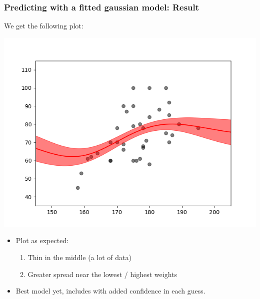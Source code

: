\documentclass[10pt,aspectratio=169,handout]{beamer}
\begin{document}
\begin{frame}
    \frametitle{Predicting with a fitted gaussian model: Result}

    We get the following plot:

    \begin{minipage}{0.45\textwidth}
        \includegraphics[width=\textwidth]{images/task-3-6.png}
    \end{minipage}
    \begin{minipage}{0.45\textwidth}
        \begin{itemize}
            \item Plot as expected:
            \begin{enumerate}
                \item Thin in the middle (a lot of data)
                \item Greater spread near the lowest / highest weights
            \end{enumerate}
            \item Best model yet, includes with added confidence in each guess.
        \end{itemize}
    \end{minipage}

\end{frame}
\end{document}
